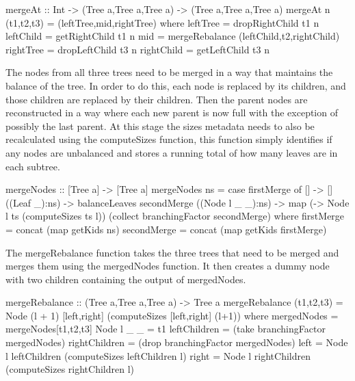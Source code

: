 \documentclass[11pt,a4paper,oneside]{article}
\begin{document}
\begin{haskell}

mergeAt :: Int -> (Tree a,Tree a,Tree a) -> (Tree a,Tree a,Tree a)
mergeAt n (t1,t2,t3) = (leftTree,mid,rightTree)
                where leftTree   = dropRightChild t1 n
                      leftChild  = getRightChild t1 n
                      mid        = mergeRebalance (leftChild,t2,rightChild)
                      rightTree  = dropLeftChild t3 n
                      rightChild = getLeftChild t3 n

\end{haskell}

The nodes from all three trees need to be merged in a way that maintains the balance of the tree. In order to do this, each node is replaced by its children, and those children are replaced by their children. Then the parent nodes are reconstructed in a way where each new parent is now full with the exception of possibly the last parent. At this stage the sizes metadata needs to also be recalculated using the computeSizes function, this function simply identifies if any nodes are unbalanced and stores a running total of how many leaves are in each subtree.  

\begin{haskell}

mergeNodes :: [Tree a] -> [Tree a]
mergeNodes ns = case firstMerge of
                  []                 -> []
                  ((Leaf _):ns)      -> balanceLeaves secondMerge
                  ((Node l _ _):ns)  -> map (\ts -> Node l ts (computeSizes ts l)) (collect branchingFactor secondMerge)
                where firstMerge  = concat (map getKids ns)
                      secondMerge = concat (map getKids firstMerge)

\end{haskell}

The mergeRebalance function takes the three trees that need to be merged and merges them using the mergedNodes function. It then creates a dummy node with two children containing the output of mergedNodes.  

\begin{haskell}

mergeRebalance :: (Tree a,Tree a,Tree a) -> Tree a
mergeRebalance (t1,t2,t3) = Node (l + 1) [left,right] (computeSizes [left,right] (l+1))
                    where mergedNodes = mergeNodes[t1,t2,t3]
                          Node l _ _  = t1
                          leftChildren = (take branchingFactor mergedNodes)
                          rightChildren = (drop branchingFactor mergedNodes)
                          left = Node l leftChildren (computeSizes leftChildren l)
                          right = Node l rightChildren (computeSizes rightChildren l)

\end{haskell}
\end{document}
